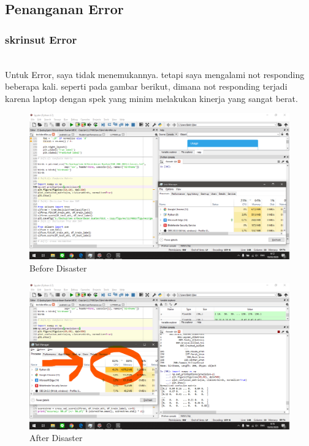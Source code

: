 \subsection{Penanganan Error}
\subsubsection{skrinsut Error}
\hfill\\
Untuk Error, saya tidak menemukannya. tetapi saya mengalami not responding beberapa kali. seperti pada gambar berikut, dimana not responding terjadi karena laptop dengan spek yang minim melakukan kinerja yang sangat berat.
\begin{figure}[H]
	\centering
	\includegraphics[width=12cm]{figures/1174075/3/error1.png}
	\caption{Before Disaster}
\end{figure}
\begin{figure}[H]
	\centering
	\includegraphics[width=12cm]{figures/1174075/3/error2.png}
	\caption{After Disaster}
\end{figure}

